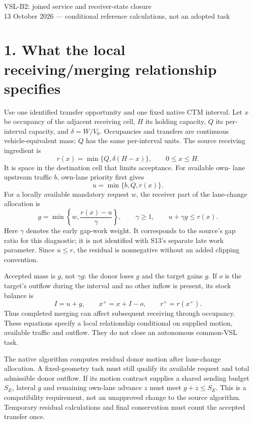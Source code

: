 \documentclass[11pt,a4paper]{article}
\begin{document}
\begin{center}
{\Large VSL-B2: joined service and receiver-state closure}\\[4pt]
13 October 2026 --- conditional reference calculations, not an adopted task
\end{center}

\section*{1. What the local receiving/merging relationship specifies}
Use one identified transfer opportunity and one fixed native CTM interval.
Let $x$ be occupancy of the adjacent receiving cell, $H$ its holding capacity,
$Q$ its per-interval capacity, and $\delta=W/V_0$. Occupancies and transfers
are continuous vehicle-equivalent mass; $Q$ has the same per-interval units.
The source receiving ingredient is
\[
 r(x)=\min\{Q,\delta(H-x)\},\qquad 0\leq x\leq H.
\]
It is space in the destination cell that limits acceptance. For available own-
lane upstream traffic $b$, own-lane priority first gives
\[
 u=\min\{b,Q,r(x)\}.
\]
For a locally available mandatory request $w$, the receiver part of the
lane-change allocation is
\[
 g=\min\left\{w,\frac{r(x)-u}{\gamma}\right\},\qquad \gamma\geq1,
 \qquad u+\gamma g\leq r(x).
\]
Here $\gamma$ denotes the early gap-work weight. It corresponds to the source's
gap ratio for this diagnostic; it is not identified with S13's separate late
work parameter. Since $u\leq r$, the residual is nonnegative without an added
clipping convention.

Accepted mass is $g$, not $\gamma g$: the donor loses $g$ and the target gains
$g$. If $o$ is the target's outflow during the interval and no other inflow is
present, its stock balance is
\[
 I=u+g,\qquad x^+=x+I-o,\qquad r^+=r(x^+).
\]
Thus completed merging can affect subsequent receiving through occupancy.
These equations specify a local relationship conditional on supplied motion,
available traffic and outflow. They do not close an autonomous common-VSL task.

The native algorithm computes residual donor motion after lane-change
allocation. A fixed-geometry task must still qualify its available request and
total admissible donor outflow. If its motion contract supplies a shared
sending budget $S_E$, lateral $g$ and remaining own-lane advance $z$ must meet
$g+z\leq S_E$. This is a compatibility requirement, not an unapproved change
to the source algorithm. Temporary residual calculations and final conservation
must count the accepted transfer once.
\end{document}
